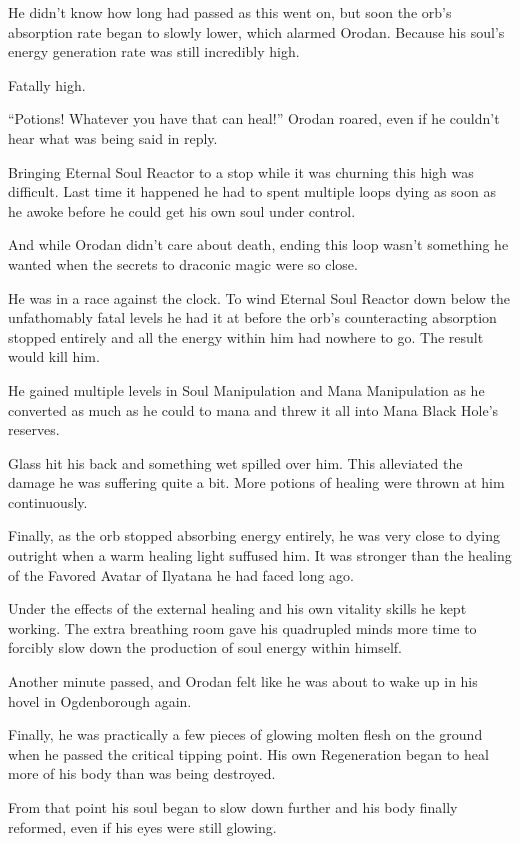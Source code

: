 \documentclass[a4paper,10pt]{book}
\begin{document}
He didn’t know how long had passed as this went on, but soon the orb’s absorption rate began to slowly lower, which alarmed Orodan. Because his soul’s energy generation rate was still incredibly high.\par
Fatally high.\par
“Potions! Whatever you have that can heal!” Orodan roared, even if he couldn’t hear what was being said in reply.\par
Bringing Eternal Soul Reactor to a stop while it was churning this high was difficult. Last time it happened he had to spent multiple loops dying as soon as he awoke before he could get his own soul under control.\par
And while Orodan didn’t care about death, ending this loop wasn’t something he wanted when the secrets to draconic magic were so close.\par
He was in a race against the clock. To wind Eternal Soul Reactor down below the unfathomably fatal levels he had it at before the orb’s counteracting absorption stopped entirely and all the energy within him had nowhere to go. The result would kill him.\par
He gained multiple levels in Soul Manipulation and Mana Manipulation as he converted as much as he could to mana and threw it all into Mana Black Hole’s reserves.\par
Glass hit his back and something wet spilled over him. This alleviated the damage he was suffering quite a bit. More potions of healing were thrown at him continuously.\par
Finally, as the orb stopped absorbing energy entirely, he was very close to dying outright when a warm healing light suffused him. It was stronger than the healing of the Favored Avatar of Ilyatana he had faced long ago.\par
Under the effects of the external healing and his own vitality skills he kept working. The extra breathing room gave his quadrupled minds more time to forcibly slow down the production of soul energy within himself.\par
Another minute passed, and Orodan felt like he was about to wake up in his hovel in Ogdenborough again.\par
Finally, he was practically a few pieces of glowing molten flesh on the ground when he passed the critical tipping point. His own Regeneration began to heal more of his body than was being destroyed.\par
From that point his soul began to slow down further and his body finally reformed, even if his eyes were still glowing.\par
\end{document}
